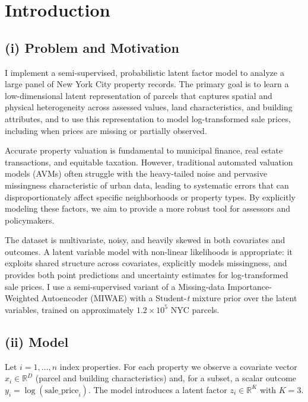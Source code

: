 \documentclass[11pt]{article}
\begin{document}
\section*{Introduction}

\subsection*{(i) Problem and Motivation}

I implement a semi-supervised, probabilistic latent factor model to analyze a large panel of New York City property records. The primary goal is to learn a low-dimensional latent representation of parcels that captures spatial and physical heterogeneity across assessed values, land characteristics, and building attributes, and to use this representation to model log-transformed sale prices, including when prices are missing or partially observed.

Accurate property valuation is fundamental to municipal finance, real estate transactions, and equitable taxation. However, traditional automated valuation models (AVMs) often struggle with the heavy-tailed noise and pervasive missingness characteristic of urban data, leading to systematic errors that can disproportionately affect specific neighborhoods or property types. By explicitly modeling these factors, we aim to provide a more robust tool for assessors and policymakers.

The dataset is multivariate, noisy, and heavily skewed in both covariates and outcomes. A latent variable model with non-linear likelihoods is appropriate: it exploits shared structure across covariates, explicitly models missingness, and provides both point predictions and uncertainty estimates for log-transformed sale prices. I use a semi-supervised variant of a Missing-data Importance-Weighted Autoencoder (MIWAE) with a Student-\emph{t} mixture prior over the latent variables, trained on approximately $1.2\times 10^5$ NYC parcels.

\subsection*{(ii) Model}

Let $i = 1,\dots, n$ index properties. For each property we observe a covariate vector $x_i \in \mathbb{R}^D$ (parcel and building characteristics) and, for a subset, a scalar outcome $y_i = \log(\text{sale\_price}_i)$. The model introduces a latent factor $z_i \in \mathbb{R}^K$ with $K = 3$.
\end{document}
